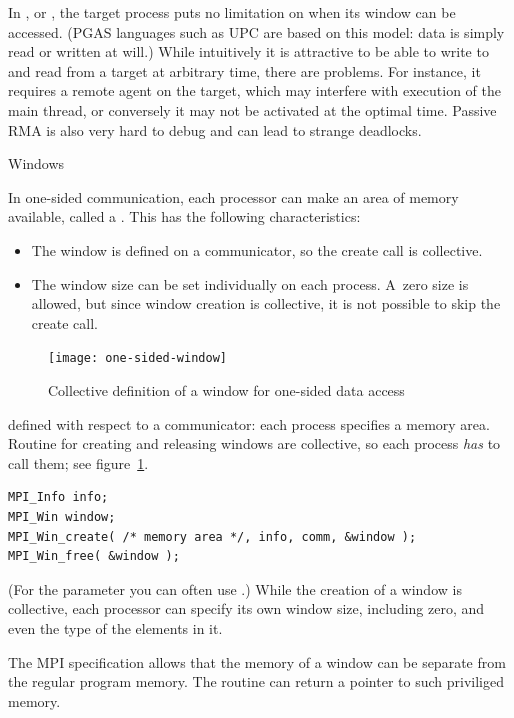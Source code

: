 In , or ,
the target process puts no limitation on when its window can be accessed.
(\ac{PGAS} languages such as \ac{UPC} are based on this model: data is 
simply read or written at will.)
While 
intuitively it is attractive to be able to write to and read from a target at
arbitrary time,
there are problems. For instance, it requires a remote agent on the target,
which may interfere with execution of the main thread, or conversely it may not be
activated at the optimal time. Passive RMA is also very hard to debug and can lead
to strange deadlocks.


 {Windows}

In one-sided communication, each processor can make an area of memory
available, called a . This has the following
characteristics:
\begin{itemize}
\item The window is defined on a communicator, so the create call
  is collective.
\item The window size can be set individually on each process.
  A~zero size is allowed, but since window creation is collective,
  it is not possible to skip the create call.
\end{itemize}
\begin{figure}[ht]
  \texttt{[image: one-sided-window]}
  \caption{Collective definition of a window for one-sided data access}
  \label{fig:window}
\end{figure}
defined with respect to a communicator: each process specifies a
memory area. Routine for creating and releasing windows
are collective, so each process \emph{has} to
call them; see figure~\ref{fig:window}. 
\begin{verbatim}
MPI_Info info;
MPI_Win window;
MPI_Win_create( /* memory area */, info, comm, &window );
MPI_Win_free( &window );
\end{verbatim}
(For the  parameter you can often use .)
While the creation of a window is collective, each
processor can specify its own window size, including zero, and even the type of the
elements in it.

The MPI specification allows that the memory of a window can be 
separate from the regular program memory. The routine 
can return a pointer to such priviliged memory.

